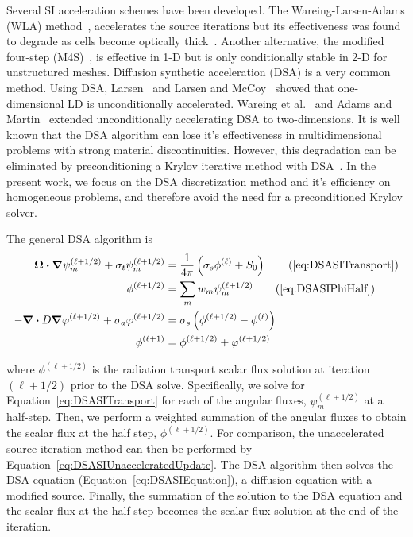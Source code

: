 \documentclass[12pt,letterpaper]{article}
\begin{document}
Several SI acceleration schemes have been developed. The Wareing-Larsen-Adams (WLA) method~\cite{WareingDSADFEM}, accelerates the source iterations but its effectiveness was found to degrade as cells become optically thick~\cite{WarsaFullyConsistentLDDSA}. Another alternative, the modified four-step (M4S)~\cite{AdamsFastIterativeMethods}, is effective in 1-D but is only conditionally stable in 2-D for unstructured meshes. Diffusion synthetic acceleration (DSA) is a very common method. Using DSA, Larsen~\cite{LarsenStableDSATheory} and Larsen and McCoy~\cite{LarsenStableDSANumericalResults} showed that one-dimensional LD is unconditionally accelerated. Wareing et al.~\cite{WareingDSADFEM} and Adams and Martin~\cite{AdamsDSADFEM} extended unconditionally accelerating DSA to two-dimensions. It is well known that the DSA algorithm can lose it's effectiveness in multidimensional problems with strong material discontinuities. However, this degradation can be eliminated by preconditioning a Krylov iterative method with DSA~\cite{WarsaKrylovDSA}. In the present work, we focus on the DSA discretization method and it's efficiency on homogeneous problems, and therefore avoid the need for a preconditioned Krylov solver.

The general DSA algorithm is
\begin{subequations}
\begin{flalign}
\vec{\Omega} \vd \grad \psi_m^{(\ell+1/2)} + \sigma_t \psi_m^{(\ell+1/2)} & = \frac{1}{4 \pi} \left(\sigma_s \phi^{(\ell)} + S_0 \right) \tag{\ref{eq:DSASITransport}} \\
\phi^{(\ell+1/2)} & = \sum_m w_m \psi_m^{(\ell+1/2)} \tag{\ref{eq:DSASIPhiHalf}} \\
-\grad \vd D \grad \varphi^{(\ell+1/2)} + \sigma_a \varphi^{(\ell+1/2)} & = \sigma_s \left(\phi^{(\ell+1/2)} - \phi^{(\ell)} \right) \label{eq:DSASIEquation} \\
\phi^{(\ell+1)} & = \phi^{(\ell+1/2)} + \varphi^{(\ell+1/2)} \label{eq:DSASIPhiEnd}
\end{flalign}
\label{eqs:DSAAlgorithm}
\end{subequations}

\noindent where $\phi^{(\ell+1/2)}$ is the radiation transport scalar flux solution at iteration $(\ell+1/2)$ prior to the DSA solve. Specifically, we solve for Equation~\ref{eq:DSASITransport} for each of the angular fluxes, $\psi^{(\ell+1/2)}_m$ at a half-step. Then, we perform a weighted summation of the angular fluxes to obtain the scalar flux at the half step, $\phi^{(\ell+1/2)}$. For comparison, the unaccelerated source iteration method can then be performed by Equation~\ref{eq:DSASIUnacceleratedUpdate}. The DSA algorithm then solves the DSA equation (Equation~\ref{eq:DSASIEquation}), a diffusion equation with a modified source. Finally, the summation of the solution to the DSA equation and the scalar flux at the half step becomes the scalar flux solution at the end of the iteration.
\end{document}
